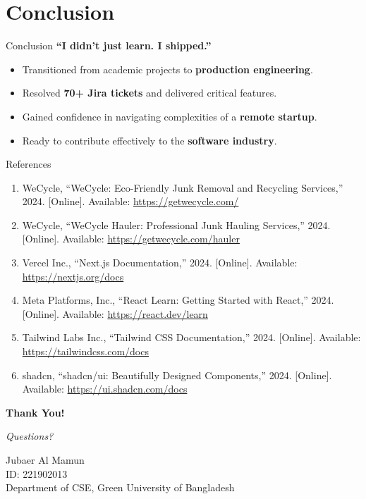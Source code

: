 \documentclass[aspectratio=169]{beamer}
\begin{document}
\section{Conclusion}
\begin{frame}{Conclusion}
    \centering
    \Large \textbf{``I didn't just learn. I shipped.''}

    \vspace{0.5cm}

    \normalsize
    \begin{itemize}
        \item Transitioned from academic projects to \textbf{production engineering}.
        \item Resolved \textbf{70+ Jira tickets} and delivered critical features.
        \item Gained confidence in navigating complexities of a \textbf{remote startup}.
        \item Ready to contribute effectively to the \textbf{software industry}.
    \end{itemize}
\end{frame}

\begin{frame}{References}
    \footnotesize
    \begin{enumerate}
        \item WeCycle, ``WeCycle: Eco-Friendly Junk Removal and Recycling Services,'' 2024. [Online]. Available: \url{https://getwecycle.com/}
        \item WeCycle, ``WeCycle Hauler: Professional Junk Hauling Services,'' 2024. [Online]. Available: \url{https://getwecycle.com/hauler}
        \item Vercel Inc., ``Next.js Documentation,'' 2024. [Online]. Available: \url{https://nextjs.org/docs}
        \item Meta Platforms, Inc., ``React Learn: Getting Started with React,'' 2024. [Online]. Available: \url{https://react.dev/learn}
        \item Tailwind Labs Inc., ``Tailwind CSS Documentation,'' 2024. [Online]. Available: \url{https://tailwindcss.com/docs}
        \item shadcn, ``shadcn/ui: Beautifully Designed Components,'' 2024. [Online]. Available: \url{https://ui.shadcn.com/docs}
    \end{enumerate}
\end{frame}

\begin{frame}
    \centering
    \vspace{2cm}
    {\Huge \textbf{Thank You!}}
    
    \vspace{1cm}
    {\Large \textit{Questions?}}
    
    \vspace{1.5cm}
    \normalsize
    Jubaer Al Mamun\\
    ID: 221902013\\
    Department of CSE, Green University of Bangladesh
\end{frame}
\end{document}
